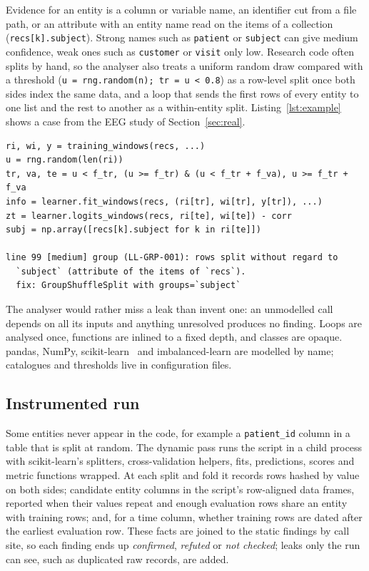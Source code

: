 \documentclass[10pt,a4paper,twocolumn]{article}
\newcommand{\code}[1]{\texttt{#1}}
\begin{document}
Evidence for an entity is a column or variable name, an identifier cut from a file path, or an attribute with an
entity name read on the items of a collection (\code{recs[k].subject}). Strong names such as \code{patient} or
\code{subject} can give medium confidence, weak ones such as \code{customer} or \code{visit} only low. Research code
often splits by hand, so the analyser also treats a uniform random draw compared with a threshold
(\code{u = rng.random(n); tr = u < 0.8}) as a row-level split once both sides index the same data, and a loop that
sends the first rows of every entity to one list and the rest to another as a within-entity split. Listing~\ref{lst:example} shows a case from
the EEG study of Section~\ref{sec:real}.

\begin{lstlisting}[float=t, caption={Random split of 1-second EEG windows pooled over patients (shortened from the case study code) and the static finding.}, label={lst:example}, captionpos=b]
ri, wi, y = training_windows(recs, ...)
u = rng.random(len(ri))
tr, va, te = u < f_tr, (u >= f_tr) & (u < f_tr + f_va), u >= f_tr + f_va
info = learner.fit_windows(recs, (ri[tr], wi[tr], y[tr]), ...)
zt = learner.logits_windows(recs, ri[te], wi[te]) - corr
subj = np.array([recs[k].subject for k in ri[te]])

line 99 [medium] group (LL-GRP-001): rows split without regard to
  `subject` (attribute of the items of `recs`).
  fix: GroupShuffleSplit with groups=`subject`
\end{lstlisting}

The analyser would rather miss a leak than invent one: an unmodelled call depends on all its inputs and anything
unresolved produces no finding. Loops are analysed once, functions are inlined to a fixed depth, and classes are
opaque. pandas, NumPy, scikit-learn~\cite{sklearn} and imbalanced-learn are modelled by name; catalogues and
thresholds live in configuration files.

\subsection{Instrumented run}

Some entities never appear in the code, for example a \code{patient\_id} column in a table that is split at random.
The dynamic pass runs the script in a child process with scikit-learn's splitters, cross-validation helpers, fits,
predictions, scores and metric functions wrapped. At each split and fold it records rows hashed by value on both
sides; candidate entity columns in the script's row-aligned data frames, reported when their values repeat and
enough evaluation rows share an entity with training rows; and, for a time column, whether training rows are dated
after the earliest evaluation row. These facts are joined to the static findings by call site, so each finding ends
up \emph{confirmed}, \emph{refuted} or \emph{not checked}; leaks only the run can see, such as duplicated raw
records, are added.
\end{document}
